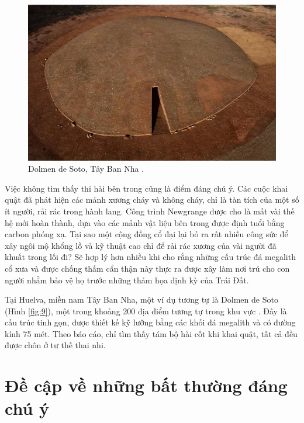 \documentclass[10pt,twocolumn,letterpaper]{article}
\begin{document}
\begin{figure}[b]
\begin{center}
   \includegraphics[width=1\linewidth]{dolmen.jpg}
\end{center}
   \caption{Dolmen de Soto, Tây Ban Nha \cite{53}.}
\label{fig:9}
\label{fig:onecol}

\end{figure}

Việc không tìm thấy thi hài bên trong cũng là điểm đáng chú ý. Các cuộc khai quật đã phát hiện các mảnh xương cháy và không cháy, chỉ là tàn tích của một số ít người, rải rác trong hành lang. Công trình Newgrange được cho là mất vài thế hệ mới hoàn thành, dựa vào các mảnh vật liệu bên trong được định tuổi bằng carbon phóng xạ. Tại sao một cộng đồng cổ đại lại bỏ ra rất nhiều công sức để xây ngôi mộ khổng lồ và kỹ thuật cao chỉ để rải rác xương của vài người đã khuất trong lối đi? Sẽ hợp lý hơn nhiều khi cho rằng những cấu trúc đá megalith cổ xưa và được chống thấm cẩn thận này thực ra được xây làm nơi trú cho con người nhằm bảo vệ họ trước những thảm họa định kỳ của Trái Đất.

Tại Huelva, miền nam Tây Ban Nha, một ví dụ tương tự là Dolmen de Soto (Hình \ref{fig:9}), một trong khoảng 200 địa điểm tương tự trong khu vực \cite{72,32}. Đây là cấu trúc tinh gọn, được thiết kế kỹ lưỡng bằng các khối đá megalith và có đường kính 75 mét. Theo báo cáo, chỉ tìm thấy tám bộ hài cốt khi khai quật, tất cả đều được chôn ở tư thế thai nhi.

\section{Đề cập về những bất thường đáng chú ý}
\end{document}
